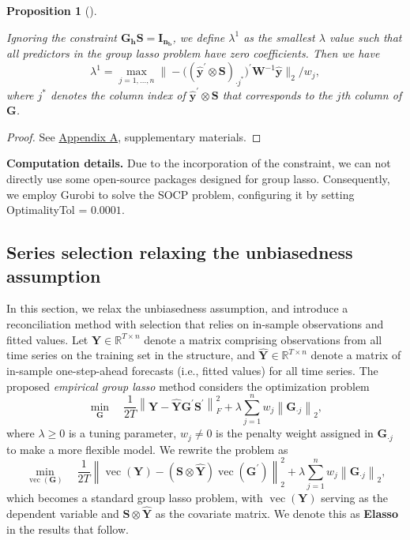 \documentclass[
  11pt]{article}
\theoremstyle{plain}
\newtheorem{proposition}{Proposition}[section]
\theoremstyle{remark}
\begin{document}
\begin{proposition}[]\protect\hypertarget{prp-3}{}\label{prp-3}

Ignoring the constraint \(\bm{G_h S}=\bm{I_{n_b}}\), we define
\(\lambda^{1}\) as the smallest \(\lambda\) value such that all
predictors in the group lasso problem have zero coefficients. Then we
have \[
\lambda^{1} = \max_{j=1, \ldots, n}\big\|-\big((\hat{\bm{y}}^{\prime} \otimes \bm{S})_{\cdot j^{*}}\big)^{\prime} \bm{W}^{-1} \hat{\bm{y}}\big\|_2 / w_j,
\] where \(j^{*}\) denotes the column index of
\(\hat{\bm{y}}^{\prime} \otimes \bm{S}\) that corresponds to the \(j\)th
column of \(\bm{G}\).

\end{proposition}

\begin{proof}
See \hyperref[appendix-proofs]{Appendix A}, supplementary materials.
\end{proof}

\textbf{Computation details.} Due to the incorporation of the
constraint, we can not directly use some open-source packages designed
for group lasso. Consequently, we employ Gurobi to solve the SOCP
problem, configuring it by setting OptimalityTol = \(0.0001\).

\subsection{Series selection relaxing the unbiasedness
assumption}\label{sec-unconstrained}

In this section, we relax the unbiasedness assumption, and introduce a
reconciliation method with selection that relies on in-sample
observations and fitted values. Let
\(\bm{Y} \in \mathbb{R}^{T \times n}\) denote a matrix comprising
observations from all time series on the training set in the structure,
and \(\hat{\bm{Y}} \in \mathbb{R}^{T \times n}\) denote a matrix of
in-sample one-step-ahead forecasts (i.e., fitted values) for all time
series. The proposed \emph{empirical group lasso} method considers the
optimization problem \[
\min_{\bm{G}} \quad \frac{1}{2 T} \left\|\bm{Y}-\hat{\bm{Y}} \bm{G}^{\prime} \bm{S}^{\prime}\right\|_F^2 + \lambda \sum_{j=1}^n w_j \left\|\bm{G}_{\cdot j}\right\|_2,
\] where \(\lambda \geq 0\) is a tuning parameter, \(w_j \neq 0\) is the
penalty weight assigned in \(\bm{G}_{\cdot j}\) to make a more flexible
model. We rewrite the problem as \[
\min_{\operatorname{vec}(\bm{G})} \quad \frac{1}{2 T} \left\|\operatorname{vec}(\bm{Y})-(\bm{S} \otimes \hat{\bm{Y}}) \operatorname{vec}\left(\bm{G}^{\prime}\right)\right\|_2^2 + \lambda \sum_{j=1}^n w_j \left\|\bm{G}_{\cdot j}\right\|_2,
\] which becomes a standard group lasso problem, with
\(\operatorname{vec}(\bm{Y})\) serving as the dependent variable and
\(\bm{S} \otimes \hat{\bm{Y}}\) as the covariate matrix. We denote this
as \textbf{Elasso} in the results that follow.
\end{document}
